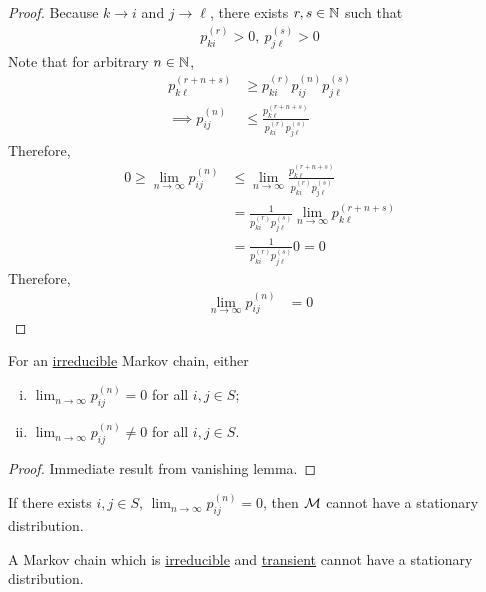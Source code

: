 \documentclass{article}
\newcommand{\upn}[0]{^{(n)}}
\begin{document}
	\begin{proof}
		Because $k \to i$ and $j \to \ell$, there exists $r, s \in \mathbb{N}$ such that
		\begin{align}
			p_{ki}^{(r)} > 0,\ 
			p_{j\ell}^{(s)} > 0
		\end{align}
		Note that for arbitrary $n \in \mathbb{N}$,
		\begin{align}
			p_{k \ell}^{(r+n+s)}
			&\geq p_{ki}^{(r)} p_{ij}^{(n)} p_{j\ell}^{(s)} \\
			\implies p_{ij}^{(n)}
			&\leq \frac{p_{k \ell}^{(r+n+s)}}{p_{ki}^{(r)}p_{j\ell}^{(s)}}
		\end{align}
		Therefore, 
		\begin{align}
			0 \geq \lim_{n \to \infty} p_{ij}\upn &\leq \lim_{n \to \infty} \frac{p_{k \ell}^{(r+n+s)}}{p_{ki}^{(r)}p_{j\ell}^{(s)}} \\
			&= \frac{1}{{p_{ki}^{(r)}p_{j\ell}^{(s)}}} \lim_{n \to \infty} {p_{k \ell}^{(r+n+s)}} \\
			&= \frac{1}{{p_{ki}^{(r)}p_{j\ell}^{(s)}}} 0 = 0 
		\end{align}
		Therefore,
		\begin{align}
			\lim_{n \to \infty} p_{ij}\upn &= 0
		\end{align}
	\end{proof}
	
	\begin{corollary}
		For an \ul{irreducible} Markov chain, either
		\begin{enumerate}[(i)]
			\item $\lim _{n \rightarrow \infty} p_{i j}^{(n)}=0$ for all $i, j \in S$;
			\item $\lim _{n \rightarrow \infty} p_{i j}^{(n)}\neq 0$ for all $i, j \in S$.
		\end{enumerate}
	\end{corollary}
	
	\begin{proof}
		Immediate result from vanishing lemma.
	\end{proof}
	
	\begin{corollary}
		If there exists $i, j \in S$, $\lim_{n \to \infty} p_{ij}\upn = 0$, then $\mathcal{{M}}$ cannot have a stationary distribution.
	\end{corollary}
	
	\begin{corollary}
		A Markov chain which is \ul{irreducible} and \ul{transient} cannot have a stationary distribution.
	\end{corollary}
	
\end{document}
